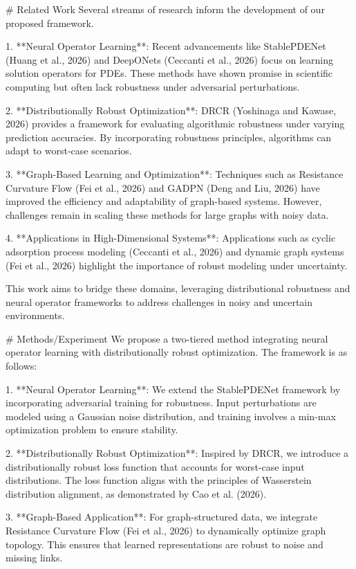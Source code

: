 # Related Work  
Several streams of research inform the development of our proposed framework. 

1. **Neural Operator Learning**: Recent advancements like StablePDENet (Huang et al., 2026) and DeepONets (Ceccanti et al., 2026) focus on learning solution operators for PDEs. These methods have shown promise in scientific computing but often lack robustness under adversarial perturbations.

2. **Distributionally Robust Optimization**: DRCR (Yoshinaga and Kawase, 2026) provides a framework for evaluating algorithmic robustness under varying prediction accuracies. By incorporating robustness principles, algorithms can adapt to worst-case scenarios.

3. **Graph-Based Learning and Optimization**: Techniques such as Resistance Curvature Flow (Fei et al., 2026) and GADPN (Deng and Liu, 2026) have improved the efficiency and adaptability of graph-based systems. However, challenges remain in scaling these methods for large graphs with noisy data.

4. **Applications in High-Dimensional Systems**: Applications such as cyclic adsorption process modeling (Ceccanti et al., 2026) and dynamic graph systems (Fei et al., 2026) highlight the importance of robust modeling under uncertainty.

This work aims to bridge these domains, leveraging distributional robustness and neural operator frameworks to address challenges in noisy and uncertain environments.

# Methods/Experiment  
We propose a two-tiered method integrating neural operator learning with distributionally robust optimization. The framework is as follows:

1. **Neural Operator Learning**: We extend the StablePDENet framework by incorporating adversarial training for robustness. Input perturbations are modeled using a Gaussian noise distribution, and training involves a min-max optimization problem to ensure stability.

2. **Distributionally Robust Optimization**: Inspired by DRCR, we introduce a distributionally robust loss function that accounts for worst-case input distributions. The loss function aligns with the principles of Wasserstein distribution alignment, as demonstrated by Cao et al. (2026).

3. **Graph-Based Application**: For graph-structured data, we integrate Resistance Curvature Flow (Fei et al., 2026) to dynamically optimize graph topology. This ensures that learned representations are robust to noise and missing links.

